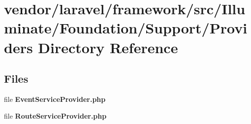 \section{vendor/laravel/framework/src/\+Illuminate/\+Foundation/\+Support/\+Providers Directory Reference}
\label{dir_924df66b43963e94a7ceda5c69523e22}
\subsection*{Files}
\begin{DoxyCompactItemize}
\item 
file {\bf Event\+Service\+Provider.\+php}
\item 
file {\bf Route\+Service\+Provider.\+php}
\end{DoxyCompactItemize}
